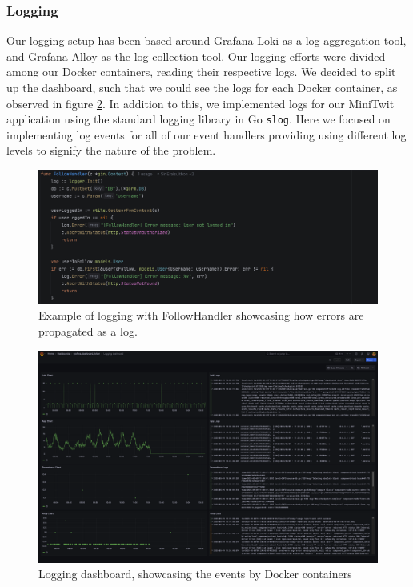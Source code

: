 \subsubsection{Logging}
Our logging setup has been based around Grafana Loki as a log aggregation tool, and Grafana Alloy as the log collection tool. Our logging efforts were divided among our Docker containers, reading their respective logs. We decided to split up the dashboard, such that we could see the logs for each Docker container, as observed in figure \ref{fig:logging}. In addition to this, we implemented logs for our MiniTwit application using the standard logging library in Go \texttt{slog}. Here we focused on implementing log events for all of our event handlers providing using different log levels to signify the nature of the problem.

\begin{figure} [H]
    \centering
    \includegraphics[width=1\linewidth]{images/StdLog.png}
    \caption{Example of logging with FollowHandler showcasing how errors are propagated as a log.}
    \label{fig:enter-label}
\end{figure}
\begin{figure} [H]
    \centering
    \includegraphics[width=1\linewidth]{images/logging.png}
    \caption{Logging dashboard, showcasing the events by Docker containers}
    \label{fig:logging}
\end{figure}

